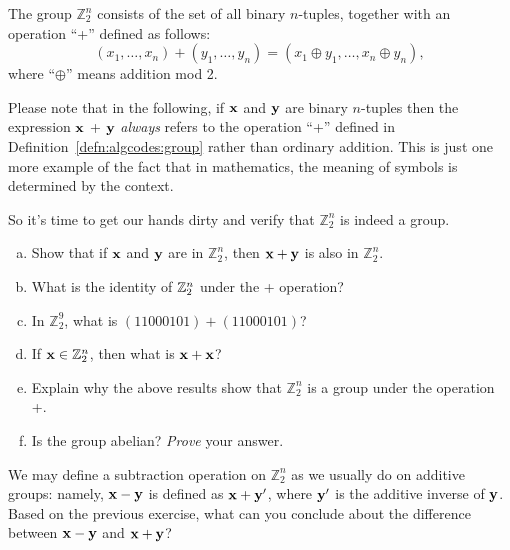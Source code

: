 \begin{defn}\label{defn:algcodes:group}
The group $\mathbb{Z}_2^n$ consists of the set of all binary $n$-tuples, together with an operation ``+'' defined as follows:
\[ (x_1, \ldots, x_n) +  (y_1, \ldots, y_n) = (x_1 \oplus y_1, \ldots, x_n \oplus y_n), \]
where ``$\oplus$'' means addition mod 2.
\end{defn}

\begin{rem}
Please note  that in the following, if  ${\bold x}$ and ${\bold y}$ are binary $n$-tuples then the expression ${\bold x}$ + ${\bold y}$ \emph{always} refers to the operation ``+'' defined in Definition~\ref{defn:algcodes:group} rather than ordinary addition. This is just one more example of the fact that in mathematics, the meaning of symbols is determined by the context.
\end{rem}

So it's time to get our hands dirty and verify that 
$\mathbb{Z}_2^n$ is indeed a group.

\begin{exercise}{}
\begin{enumerate}[(a)]
\item
Show that if ${\bold x}$ and ${\bold y}$ are in $\mathbb{Z}_2^n$, then ${\bold x} + {\bold y}$ is also in $\mathbb{Z}_2^n$.
\item
What is the identity of ${\Bbb Z}_2^n$ under the + operation?
\item
In $\mathbb{Z}_2^9$, what is $(11000101) + (11000101)$?
\item
If ${\bold x} \in \mathbb{Z}_2^n$, then what is ${\bold x} + {\bold x}$?
\item
Explain why the above results show that $\mathbb{Z}_2^n$ is a group under the operation +.
\item
Is the group abelian? \emph{Prove} your answer.
\end{enumerate}
\end{exercise} 

\begin{exercise}{}
We may define a subtraction operation on $\mathbb{Z}_2^n$ as we usually do on additive groups: namely, ${\bold x} - {\bold y}$ is defined as ${\bold x} + {\bold y'}$, where ${\bold y'}$ is the additive inverse of ${\bold y}$.  Based on the previous exercise, what can you conclude about the difference between ${\bold x} - {\bold y}$ and ${\bold x} + {\bold y}$?
\end{exercise} 
  
